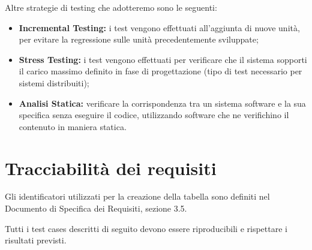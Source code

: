 \documentclass{article}
\begin{document}
Altre strategie di testing che adotteremo sono le seguenti:
\begin{itemize}
\item \textbf{Incremental Testing: }i test vengono effettuati all'aggiunta di nuove unità, per evitare la regressione sulle unità precedentemente sviluppate;
\item \textbf{Stress Testing: }i test vengono effettuati per verificare che il
sistema sopporti il carico massimo definito in fase di progettazione
(tipo di test necessario per sistemi distribuiti);
\item \textbf{Analisi Statica:}
verificare la corrispondenza tra un sistema software e la sua specifica
senza eseguire il codice, utilizzando software che ne verifichino il contenuto in maniera statica.
\end{itemize}

\section{Tracciabilità dei
requisiti}

Gli identificatori utilizzati per la creazione della tabella sono
definiti nel Documento di Specifica dei Requisiti, sezione 3.5.

Tutti i test cases descritti di seguito devono essere riproducibili e
rispettare i risultati previsti.
\end{document}
